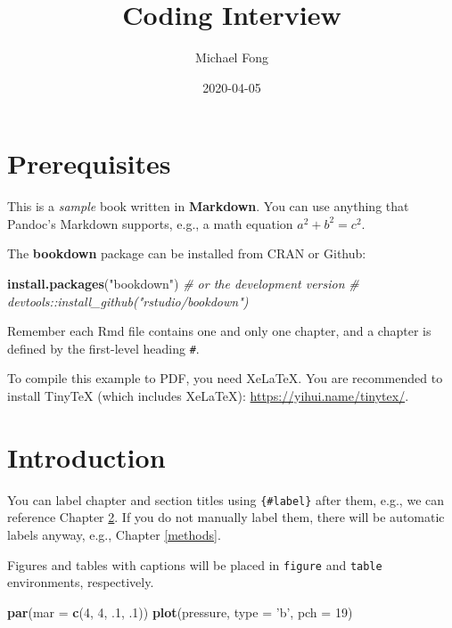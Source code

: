 \documentclass[]{book}
\title{Coding Interview}
\author{Michael Fong}
\date{2020-04-05}
\newenvironment{Shaded}{\begin{snugshade}}{\end{snugshade}}
\newcommand{\KeywordTok}[1]{\textcolor[rgb]{0.13,0.29,0.53}{\textbf{#1}}}
\newcommand{\DataTypeTok}[1]{\textcolor[rgb]{0.13,0.29,0.53}{#1}}
\newcommand{\DecValTok}[1]{\textcolor[rgb]{0.00,0.00,0.81}{#1}}
\newcommand{\StringTok}[1]{\textcolor[rgb]{0.31,0.60,0.02}{#1}}
\newcommand{\CommentTok}[1]{\textcolor[rgb]{0.56,0.35,0.01}{\textit{#1}}}
\newcommand{\NormalTok}[1]{#1}
\begin{document}
\maketitle

{
\setcounter{tocdepth}{1}
\tableofcontents
}
\chapter{Prerequisites}\label{prerequisites}

This is a \emph{sample} book written in \textbf{Markdown}. You can use
anything that Pandoc's Markdown supports, e.g., a math equation
\(a^2 + b^2 = c^2\).

The \textbf{bookdown} package can be installed from CRAN or Github:

\begin{Shaded}
\begin{Highlighting}[]
\KeywordTok{install.packages}\NormalTok{(}\StringTok{"bookdown"}\NormalTok{)}
\CommentTok{# or the development version}
\CommentTok{# devtools::install_github("rstudio/bookdown")}
\end{Highlighting}
\end{Shaded}

Remember each Rmd file contains one and only one chapter, and a chapter
is defined by the first-level heading \texttt{\#}.

To compile this example to PDF, you need XeLaTeX. You are recommended to
install TinyTeX (which includes XeLaTeX):
\url{https://yihui.name/tinytex/}.

\chapter{Introduction}\label{intro}

You can label chapter and section titles using \texttt{\{\#label\}}
after them, e.g., we can reference Chapter \ref{intro}. If you do not
manually label them, there will be automatic labels anyway, e.g.,
Chapter \ref{methods}.

Figures and tables with captions will be placed in \texttt{figure} and
\texttt{table} environments, respectively.

\begin{Shaded}
\begin{Highlighting}[]
\KeywordTok{par}\NormalTok{(}\DataTypeTok{mar =} \KeywordTok{c}\NormalTok{(}\DecValTok{4}\NormalTok{, }\DecValTok{4}\NormalTok{, .}\DecValTok{1}\NormalTok{, .}\DecValTok{1}\NormalTok{))}
\KeywordTok{plot}\NormalTok{(pressure, }\DataTypeTok{type =} \StringTok{'b'}\NormalTok{, }\DataTypeTok{pch =} \DecValTok{19}\NormalTok{)}
\end{Highlighting}
\end{Shaded}
\end{document}
